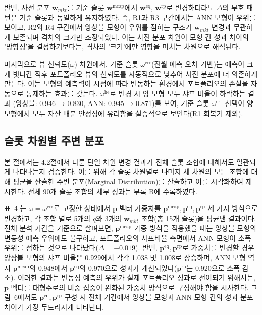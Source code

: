 \documentclass{article}
\begin{document}
반면, 사전 분포 $\mathbf{w}_{mkt}$를 기준 슬롯 $\mathbf{w}^{\mathrm{mcap}}$에서 $\mathbf{w}^{\mathrm{eq}}$, $\mathbf{w}^{\mathrm{rp}}$로 변경하더라도 $\Delta$의 부호 패턴은 기준 슬롯과 동일하게 유지하였다. 즉, R1과 R3 구간에서는 ANN 모형이 우위를 보이고, R2와 R4 구간에서 앙상블 모형이 우위를 점하는 구조가 $\mathbf{w}_{mkt}$ 변경과 무관하게 보존되며 격차의 크기만 조정되었다. 이는 사전 분포 차원이 모형 간 성과 차이의 '방향성'을 결정하기보다는, 격차의 '크기'에만 영향을 미치는 차원으로 해석된다.

마지막으로 뷰 신뢰도($\omega$) 차원에서, 기준 슬롯 $\omega^{\mathrm{err}}$(전월 예측 오차 기반)는 예측이 크게 빗나간 직후 포트폴리오 뷰의 신뢰도를 자동적으로 낮추어 사전 분포에 더 의존하게 만든다. 이는 모형의 예측력이 시점에 따라 변동하는 환경에서 포트폴리오의 손실을 자동으로 통제하는 효과를 갖는다. $\omega^{\mathrm{he}}$로 변경 시 양 모형 모두 샤프 비율이 하락하는 결과 (앙상블: 0.946 → 0.830, ANN: 0.945 → 0.871)를 보여, 기준 슬롯 $\omega^{\mathrm{err}}$ 선택이 양 모형에서 모두 자산 배분 안정성에 유리함을 실증적으로 보인다(R1 회복기 제외).

\subsection{슬롯 차원별 주변 분포}\label{subsec:slot_config}

본 절에서는 4.2절에서 다룬 단일 차원 변경 결과가 전체 슬롯 조합에 대해서도 일관되게 나타나는지 검증한다. 이를 위해 각 슬롯 차원별로 나머지 세 차원의 모든 조합에 대해 평균을 산출한 주변 분포(Marginal Distribution)를 산출하고 이를 시각화하여 제시한다. 전체 90개 슬롯 조합의 세부 성과는 부록 B에 수록하였다.

표~4 는 $\omega = \omega^{\mathrm{err}}$로 고정한 상태에서 $\mathbf{p}$ 벡터 가중치를 $\mathbf{p}^{\mathrm{mcap}}, \mathbf{p}^{\mathrm{eq}}, \mathbf{p}^{\mathrm{rp}}$ 세 가지 방식으로 변경하고, 각 조합 별로 5개의 $q$와 3개의 $\mathbf{w}_{mkt}$ 조합(총 15개 슬롯)을 평균낸 결과이다. 전체 분석 기간을 기준으로 살펴보면, $\mathbf{p}^{\mathrm{mcap}}$ 가중 방식을 적용했을 때는 앙상블 모형의 변동성 예측 우위에도 불구하고, 포트폴리오의 샤프비율 측면에서 ANN 모형이 소폭 우위를 점하는 것으로 나타났다($\Delta = -0.019$). 반면, $\mathbf{p}^{\mathrm{eq}}, \mathbf{p}^{\mathrm{rp}}$로 가중치를 변경할 경우 앙상블 모형의 샤프 비율은 0.929에서 각각 1.038 및 1.008로 상승하며, ANN 모형 역시 $\mathbf{p}^{\mathrm{mcap}}$의 0.948에서 $\mathbf{p}^{\mathrm{eq}}$의 0.970으로 성과가 개선되었다($\mathbf{p}^{\mathrm{rp}}$는 0.920으로 소폭 감소). 이러한 결과는 변동성 예측의 우위가 실제 포트폴리오 성과로 전이되기 위해서는, $\mathbf{p}$ 벡터를 대형주로의 비중 집중이 완화된 가중치 방식으로 구성해야 함을 시사한다. 그림~6에서도 $\mathbf{p}^{\mathrm{eq}}, \mathbf{p}^{\mathrm{rp}}$ 구성 시 전체 기간에서 앙상블 모형과 ANN 모형 간의 성과 분포 차이가 가장 두드러지게 나타난다.
\end{document}
